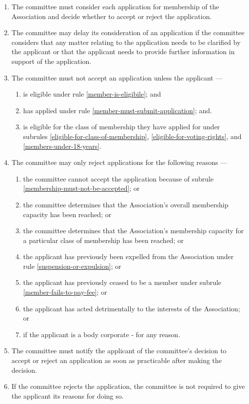 \documentclass[../constitution.tex]{subfiles}
\begin{document}
\begin{enumerate}
  \item The committee must consider each application for membership of the Association and decide whether to accept or reject the application.
  \item The committee may delay its consideration of an application if the committee considers that any matter relating to the application needs to be clarified by the applicant or that the applicant needs to provide further information in support of the application.
  \item The committee must not accept an application unless the applicant --- \label{membership-must-not-be-accepted}
        \begin{enumerate}
          \item is eligible under rule \ref{member-is-eligibile}; and
          \item has applied under rule \ref{member-must-submit-application}; and.
          \item is eligible for the class of membership they have applied for under subrules \ref{eligible-for-class-of-membership}, \ref{eligible-for-voting-rights}, and \ref{members-under-18-years}.
        \end{enumerate}

  \item \label{reasons-why-committee-can-reject-membership-application} The committee may only reject applications for the following reasons ---
        \begin{enumerate}
          \item the committee cannot accept the application because of subrule \ref{membership-must-not-be-accepted}; or
          \item the committee determines that the Association's overall membership capacity has been reached; or
          \item the committee determines that the Association's membership capacity for a particular class of membership has been reached; or
          \item the applicant has previously been expelled from the Association under rule \ref{suspension-or-expulsion}; or
          \item the applicant has previously ceased to be a member under subrule \ref{member-fails-to-pay-fee}; or
          \item \label{reject-membership-detrimental} the applicant has acted detrimentally to the interests of the Association; or
          \item \label{reject-membership-body-corporate} if the applicant is a body corporate - for any reason.
        \end{enumerate}

  \item The committee must notify the applicant of the committee's decision to accept or reject an application as soon as practicable after making the decision.

  \item If the committee rejects the application, the committee is not required to give the applicant its reasons for doing so.
\end{enumerate}
\end{document}
